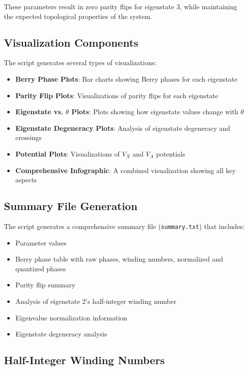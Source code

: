\documentclass{article}
\begin{document}
These parameters result in zero parity flips for eigenstate 3, while maintaining the expected topological properties of the system.

\subsection{Visualization Components}

The script generates several types of visualizations:

\begin{itemize}
    \item \textbf{Berry Phase Plots}: Bar charts showing Berry phases for each eigenstate
    \item \textbf{Parity Flip Plots}: Visualizations of parity flips for each eigenstate
    \item \textbf{Eigenstate vs. $\theta$ Plots}: Plots showing how eigenstate values change with $\theta$
    \item \textbf{Eigenstate Degeneracy Plots}: Analysis of eigenstate degeneracy and crossings
    \item \textbf{Potential Plots}: Visualizations of $V_X$ and $V_A$ potentials
    \item \textbf{Comprehensive Infographic}: A combined visualization showing all key aspects
\end{itemize}

\subsection{Summary File Generation}

The script generates a comprehensive summary file (\texttt{summary.txt}) that includes:

\begin{itemize}
    \item Parameter values
    \item Berry phase table with raw phases, winding numbers, normalized and quantized phases
    \item Parity flip summary
    \item Analysis of eigenstate 2's half-integer winding number
    \item Eigenvalue normalization information
    \item Eigenstate degeneracy analysis
\end{itemize}

\subsection{Half-Integer Winding Numbers}
\end{document}
